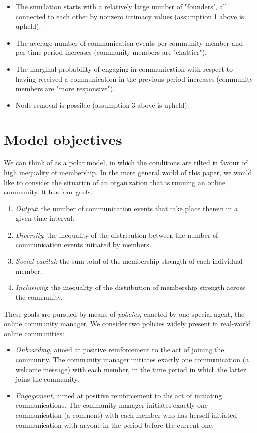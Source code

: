 \documentclass{article}
\begin{document}
\begin{itemize}
	\item The simulation starts with a relatively large number of  "founders", all connected to each other by nonzero intimacy values (assumption 1 above is upheld).
	\item The average number of communication events per community member and per time period increases (community members are "chattier"). 
	\item The marginal probability of engaging in communication with respect to having received a communication in the previous period increases (community members are "more responsive").
	\item Node removal is possible (assumption 3 above is upheld).
\end{itemize}

\section{Model objectives}

We can think of \cite{kim2015group} as a polar model, in which the conditions are tilted in favour of high inequality of membership. In the more general world of this paper, we would like to consider the situation of an organization that is running an online community. It has four goals.

\begin{enumerate}
	\item \textit{Output}: the number of communication events that take place therein in a given time interval.
	\item  \textit{Diversity}: the inequality of the distribution between the number of communication events initiated by members. 
	\item \textit{Social capital}: the sum total of the membership strength of each individual member.
	\item \textit{Inclusivity}: the inequality of the distribution of membership strength across the community.
\end{enumerate}

These goals are pursued by means of \textit{policies}, enacted by one special agent, the online community manager. We consider two policies widely present in real-world online communities:
\begin{itemize}
	\item \textit{Onboarding}, aimed at positive reinforcement to the act of joining the community. The community manager initiates exactly one communication (a welcome message) with each member, in the time period in which the latter joins the community.
	\item \textit{Engagement}, aimed at positive reinforcement to the act of initiating communications. The community manager initiates exactly one communication (a comment) with each member who has herself initiated communication with anyone in the period before the current one.
\end{itemize}  
\end{document}
